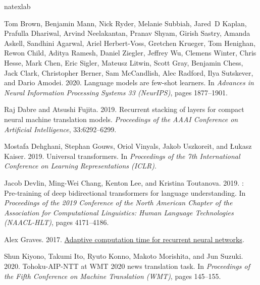 \documentclass[11pt]{article}
\begin{document}
\begin{thebibliography}{16}
\expandafter\ifx\csname natexlab\endcsname\relax\def\natexlab#1{#1}\fi

Tom Brown, Benjamin Mann, Nick Ryder, Melanie Subbiah, Jared~D Kaplan, Prafulla
  Dhariwal, Arvind Neelakantan, Pranav Shyam, Girish Sastry, Amanda Askell,
  Sandhini Agarwal, Ariel Herbert-Voss, Gretchen Krueger, Tom Henighan, Rewon
  Child, Aditya Ramesh, Daniel Ziegler, Jeffrey Wu, Clemens Winter, Chris
  Hesse, Mark Chen, Eric Sigler, Mateusz Litwin, Scott Gray, Benjamin Chess,
  Jack Clark, Christopher Berner, Sam McCandlish, Alec Radford, Ilya Sutskever,
  and Dario Amodei. 2020.
\newblock Language models are few-shot learners.
\newblock In \emph{Advances in Neural Information Processing Systems 33
  (NeurIPS)}, pages 1877--1901.

Raj Dabre and Atsushi Fujita. 2019.
\newblock Recurrent stacking of layers for compact neural machine translation
  models.
\newblock \emph{Proceedings of the AAAI Conference on Artificial Intelligence},
  33:6292--6299.

Mostafa Dehghani, Stephan Gouws, Oriol Vinyals, Jakob Uszkoreit, and Łukasz
  Kaiser. 2019.
\newblock Universal transformers.
\newblock In \emph{Proceedings of the 7th International Conference on Learning
  Representations (ICLR)}.

Jacob Devlin, Ming-Wei Chang, Kenton Lee, and Kristina Toutanova. 2019.
: Pre-training of deep bidirectional transformers for language
  understanding.
\newblock In \emph{Proceedings of the 2019 Conference of the North {A}merican
  Chapter of the Association for Computational Linguistics: Human Language
  Technologies (NAACL-HLT)}, pages 4171--4186.

Alex Graves. 2017.
\newblock \href {http://arxiv.org/abs/1603.08983} {Adaptive computation time
  for recurrent neural networks}.

Shun Kiyono, Takumi Ito, Ryuto Konno, Makoto Morishita, and Jun Suzuki. 2020.
\newblock Tohoku-{AIP}-{NTT} at {WMT} 2020 news translation task.
\newblock In \emph{Proceedings of the Fifth Conference on Machine Translation
  (WMT)}, pages 145--155.


\end{thebibliography}
\end{document}
